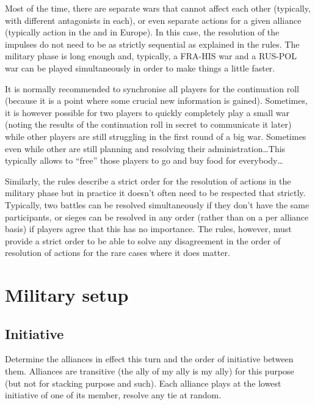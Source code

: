 \begin{playtip}[Simultaneity]
  Most of the time, there are separate wars that cannot affect each other
  (typically, with different antagonists in each), or even separate actions
  for a given alliance (typically action in the \ROTW and in Europe). In this
  case, the resolution of the impulses do not need to be as strictly
  sequential as explained in the rules. The military phase is long enough and,
  typically, a FRA-HIS war and a RUS-POL war can be played simultaneously in
  order to make things a little faster.

  It is normally recommended to synchronise all players for the continuation
  roll (because it is a point where some crucial new information is
  gained). Sometimes, it is however possible for two players to quickly
  completely play a small war (noting the results of the continuation roll in
  secret to communicate it later) while other players are still struggling in
  the first round of a big war. Sometimes even while other are still planning
  and resolving their administration\ldots This typically allows to ``free''
  those players to go and buy food for everybody\ldots

  \smallskip

  Similarly, the rules describe a strict order for the resolution of actions
  in the military phase but in practice it doesn't often need to be respected
  that strictly. Typically, two battles can be resolved simultaneously if they
  don't have the same participants, or sieges can be resolved in any order
  (rather than on a per alliance basis) if players agree that this has no
  importance. The rules, however, must provide a strict order to be able to
  solve any disagreement in the order of resolution of actions for the rare
  cases where it does matter.
\end{playtip}

\section{Military setup}
\subsection{Initiative}
Determine the alliances in effect this turn and the order of initiative
between them. Alliances are transitive (the ally of my ally is my ally) for
this purpose (but not for stacking purpose and such). Each alliance plays at
the lowest initiative of one of its member, resolve any tie at random.

